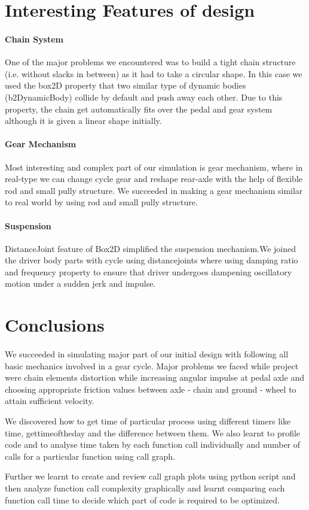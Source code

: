 \documentclass[11pt]{article}
\begin{document}
\section{Interesting Features of design}
\paragraph{Chain System}
	One of the major problems we encountered was to build a tight chain structure (i.e. without slacks in between) as it had to take a circular
	 shape. In this case we used the box2D property that two similar type of dynamic bodies (b2DynamicBody) collide by default and push 
	away each other. Due to this property, the chain get automatically fits over the pedal and gear system although it is given a linear shape
	 initially.

\paragraph{Gear Mechanism}
	Most interesting and complex part of our simulation is gear mechanism, where in real-type we can change cycle gear and reshape 
	rear-axle with the help of flexible rod and small pully structure. We succeeded in making a gear mechanism similar to real world 
	by using rod and small pully structure.
	
\paragraph{Suspension}
	DistanceJoint feature of Box2D simplified the suspension mechanism.We joined the driver body parts with cycle using distancejoints
	where using damping ratio and frequency property to ensure that driver undergoes dampening oscillatory motion under a sudden jerk and
	impulse.
	
\section{Conclusions}
\paragraph{}
	We succeeded in simulating major part of our initial design with following all basic mechanics involved in a gear cycle.
	Major problems we faced while project were chain elements distortion while increasing angular impulse at pedal axle and choosing
	appropriate friction values between axle - chain and ground - wheel to attain sufficient velocity.   

	We discovered how to get time of particular process using different timers like time, gettimeoftheday and the 
	difference between them. We also learnt to profile code and to analyse time taken by each function call individually 
	and number of calls for a particular function using call graph.

	Further we learnt to create and review call graph plots using python script and then analyze function call complexity graphically
 and learnt comparing each function call time to decide which part of code is required to be optimized.
	


\end{document}
